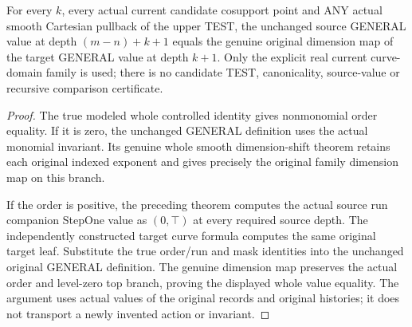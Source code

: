 \begin{theorem}
\label{hir:original-untested-modeled-curve-full-smooth-value}
\leanok
For every $k$, every actual current candidate cosupport point and ANY
actual smooth Cartesian pullback of the upper TEST, the unchanged
source GENERAL value at depth $(m-n)+k+1$ equals the genuine original
dimension map of the target GENERAL value at depth $k+1$.
Only the explicit real current curve-domain family is used; there is
no candidate TEST, canonicality, source-value or recursive comparison
certificate.
\end{theorem}
\begin{proof}
The true modeled whole controlled identity gives nonmonomial order
equality. If it is zero, the unchanged GENERAL definition uses the
actual monomial invariant. Its genuine whole smooth dimension-shift
theorem retains each original indexed exponent and gives precisely
the original family dimension map on this branch.

If the order is positive, the preceding theorem computes the actual
source run companion StepOne value as $(0,\top)$ at every required
source depth. The independently constructed target curve formula
computes the same original target leaf. Substitute the true order/run
and mask identities into the unchanged original GENERAL definition.
The genuine dimension map preserves the actual order and level-zero
top branch, proving the displayed whole value equality. The argument
uses actual values of the original records and original histories;
it does not transport a newly invented action or invariant.
\end{proof}

